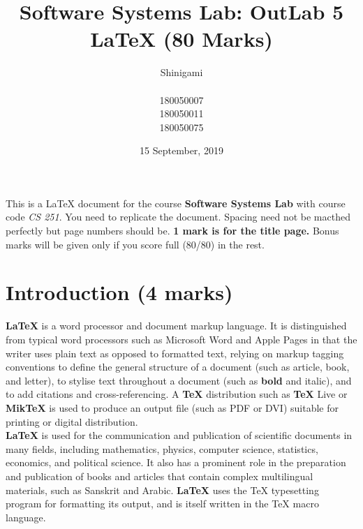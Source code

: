 \documentclass[11pt]{article}
\begin{document}
\begin{titlingpage}
\title{\textbf{Software Systems Lab: OutLab 5\\\LaTeX{} (80 Marks)}}
\author{\Large Shinigami\\\\\normalsize 180050007\\\normalsize 180050011\\\normalsize 180050075}
\date{15 September, 2019}
\end{titlingpage}

\maketitle
\clearpage
{}
\newpage
\tableofcontents
\newpage
This is a \LaTeX{} document for the course {\textbf{Software Systems Lab}} with course code {\textit{CS 251}}. You need to replicate the document. Spacing need not be macthed perfectly but page numbers should be. {\textbf{1 mark is for the title page.}} Bonus marks will be given only if you score full (80/80) in the rest.

\section{Introduction (4 marks)}
{\textbf{\LaTeX{}}} is a word processor and document markup language. It is distinguished from typical word processors such as Microsoft Word and Apple Pages in that the writer uses plain text as opposed to formatted text, relying on markup tagging conventions to define the general structure of a  document (such as article, book, and letter), to stylise text throughout a document (such as {\textbf{bold}} and italic), and to add citations and cross-referencing. A {\textbf{\TeX{}}} distribution such as {\textbf{\TeX{}} Live} or {\textbf{MikTeX}} is used to produce an output file (such as PDF or DVI) suitable for printing or digital distribution.\\

{\textbf{\LaTeX{}}} is used for the communication and publication of scientific documents in many fields, including mathematics, physics, computer science, statistics, economics, and political science. It also has a prominent role in the preparation and publication of books and articles that contain complex multilingual materials, such as Sanskrit and Arabic. {\textbf{\LaTeX{}}} uses the TeX typesetting program for formatting its output, and is itself written in the TeX macro language.\\
\end{document}
